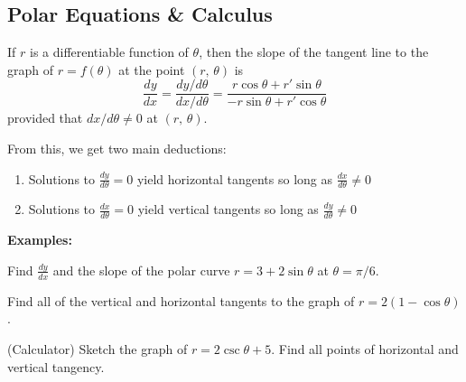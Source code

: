 \documentclass[addpoints, 12pt]{exam}
\begin{document}
\begin{questions}
\begin{minipage}{0.45\linewidth}
    \end{minipage}
\end{questions}
    
    


\newpage
{}
\subsection*{Polar Equations \& Calculus}

\begin{tcolorbox}[title= SLOPE IN POLAR FORM ,colframe=black,sharp corners,colback=white,colbacktitle=white,coltitle=black]

    
    If $r$ is a differentiable function of $\theta$, then the slope of the tangent line to the graph of $r=f(\theta)$ at the point $(r,\,\theta)$ is
    \[\frac{dy}{dx}=\frac{dy/d\theta}{dx/d\theta}=\frac{r\cos\theta+r'\sin\theta}{-r\sin\theta+r'\cos\theta}\]
    provided that $dx/d\theta\ne0$ at $(r,\,\theta)$.
    
\end{tcolorbox}
\vspace{.1cm}

From this, we get two main deductions:
\begin{enumerate}
    \item Solutions to $\displaystyle\frac{dy}{d\theta}=0$ yield horizontal tangents so long as $\displaystyle\frac{dx}{d\theta}\ne0$
    \item Solutions to $\displaystyle\frac{dx}{d\theta}=0$ yield vertical tangents so long as $\displaystyle\frac{dy}{d\theta}\ne0$
\end{enumerate}
\noindent\textbf{Examples:}
\begin{questions}
    \question Find $\frac{dy}{dx}$ and the slope of the polar curve $r=3+2\sin\theta$ at $\theta=\pi/6$.
    
    \question Find all of the vertical and horizontal tangents to the graph of $r=2(1-\cos\theta)$.
    
    \question (Calculator) Sketch the graph of $r=2\csc\theta+5$. Find all points of horizontal and vertical tangency.
\end{questions}
\end{document}
